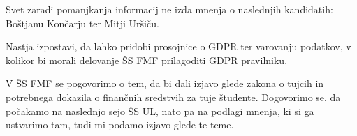 \documentclass{seja}
\begin{document}
\begin{ad}
\begin{sklep*}
\begin{itemize}
        \end{itemize}
            
        Svet zaradi pomanjkanja informacij ne izda mnenja o naslednjih kandidatih: Boštjanu Končarju ter Mitji Uršiču.
    \end{sklep*}

\item
Nastja izpostavi, da lahko pridobi prosojnice o GDPR ter varovanju podatkov, v kolikor bi morali delovanje ŠS FMF prilagoditi GDPR pravilniku.

V ŠS FMF se pogovorimo o tem, da bi dali izjavo glede zakona o tujcih in potrebnega dokazila o finančnih sredstvih za tuje študente. Dogovorimo se, da počakamo na naslednjo sejo ŠS UL, nato pa na podlagi mnenja, ki si ga ustvarimo tam, tudi mi podamo izjavo glede te teme.
\end{ad}
\end{document}
